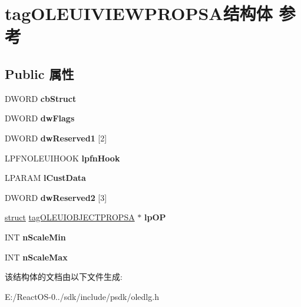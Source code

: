 \hypertarget{structtag_o_l_e_u_i_v_i_e_w_p_r_o_p_s_a}{}\section{tag\+O\+L\+E\+U\+I\+V\+I\+E\+W\+P\+R\+O\+P\+S\+A结构体 参考}
\label{structtag_o_l_e_u_i_v_i_e_w_p_r_o_p_s_a}
\subsection*{Public 属性}
\begin{DoxyCompactItemize}
\item 
\mbox{\label{structtag_o_l_e_u_i_v_i_e_w_p_r_o_p_s_a_af4b4bdf3c4f6a6538785c8fc29eda125}} 
D\+W\+O\+RD {\bfseries cb\+Struct}
\item 
\mbox{\label{structtag_o_l_e_u_i_v_i_e_w_p_r_o_p_s_a_a09e80efeb72ea3790a1989875f0df2a4}} 
D\+W\+O\+RD {\bfseries dw\+Flags}
\item 
\mbox{\label{structtag_o_l_e_u_i_v_i_e_w_p_r_o_p_s_a_a33a6091f886d1c1d07eea507a4ebf813}} 
D\+W\+O\+RD {\bfseries dw\+Reserved1} \mbox{[}2\mbox{]}
\item 
\mbox{\label{structtag_o_l_e_u_i_v_i_e_w_p_r_o_p_s_a_a671664dbc899ca43a0c4a1b777ff0546}} 
L\+P\+F\+N\+O\+L\+E\+U\+I\+H\+O\+OK {\bfseries lpfn\+Hook}
\item 
\mbox{\label{structtag_o_l_e_u_i_v_i_e_w_p_r_o_p_s_a_a99aa3060622f60e613d67af2c96a4d0a}} 
L\+P\+A\+R\+AM {\bfseries l\+Cust\+Data}
\item 
\mbox{\label{structtag_o_l_e_u_i_v_i_e_w_p_r_o_p_s_a_a32fc9c94a3b799ca97d76e29ca82c1db}} 
D\+W\+O\+RD {\bfseries dw\+Reserved2} \mbox{[}3\mbox{]}
\item 
\mbox{\label{structtag_o_l_e_u_i_v_i_e_w_p_r_o_p_s_a_ae051891bc5d520b1cc8337534ecc7e71}} 
\hyperlink{interfacestruct}{struct} \hyperlink{structtag_o_l_e_u_i_o_b_j_e_c_t_p_r_o_p_s_a}{tag\+O\+L\+E\+U\+I\+O\+B\+J\+E\+C\+T\+P\+R\+O\+P\+SA} $\ast$ {\bfseries lp\+OP}
\item 
\mbox{\label{structtag_o_l_e_u_i_v_i_e_w_p_r_o_p_s_a_a94240835e1ae497f2a8cda07b2b7dacb}} 
I\+NT {\bfseries n\+Scale\+Min}
\item 
\mbox{\label{structtag_o_l_e_u_i_v_i_e_w_p_r_o_p_s_a_a60f8d8631a453929f68dedfa3a101c50}} 
I\+NT {\bfseries n\+Scale\+Max}
\end{DoxyCompactItemize}


该结构体的文档由以下文件生成\+:\begin{DoxyCompactItemize}
\item 
E\+:/\+React\+O\+S-\/0../sdk/include/psdk/oledlg.\+h\end{DoxyCompactItemize}
